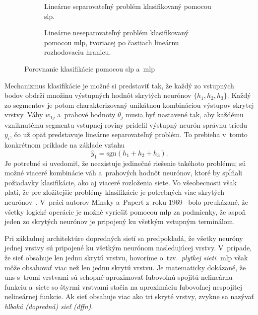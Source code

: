   \begin{figure}[t!]
    \centering
    \begin{subfigure}[t]{0.48\textwidth}\centering
      
      \caption{Lineárne separovateľný problém klasifikovaný pomocou \acrshort{slp}.}
    \end{subfigure}
    \hfill
    \begin{subfigure}[t]{0.48\textwidth}\centering
      
      \caption{Lineárne neseparovateľný problém klasifikovaný pomocou \acrshort{mlp}, tvoriacej po častiach lineárnu rozhodovaciu hranicu.}
    \end{subfigure}
    \caption[Porovnanie klasifikácie pomocou \acrshort{slp} a~\acrshort{mlp}]{Porovnanie klasifikácie pomocou \acrshort{slp} a~\acrshort{mlp}}\label{fig:lin-sep-solution}
  \end{figure}

  Mechanizmus klasifikácie je možné si predstaviť tak, že každý zo vstupných bodov obdrží množinu výstupných hodnôt skrytých neurónov $\{h_1, h_2, h_3\}$. Každý zo segmentov je potom charakterizovaný unikátnou kombináciou výstupov skrytej vrstvy. Váhy $w_{1j}$ a~prahové hodnoty ${\theta_j}$ musia byť nastavené tak, aby každému vzniknutému segmentu vstupnej roviny pridelil výstupný neurón správnu triedu $y_i$, čo už opäť predstavuje lineárne separovateľný problém. To prebieha v~tomto konkrétnom príklade na základe vzťahu
  \begin{equation}
    \hat y_1 = \mathrm{sgn} \left( h_1 + h_2 + h_3 \right).
  \end{equation}
  Je potrebné si uvedomiť, že neexistuje jedinečné riešenie takéhoto problému; sú možné viaceré kombinácie váh a~prahových hodnôt neurónov, ktoré by spĺňali požiadavky klasifikácie, ako aj viaceré rozloženia siete. Vo všeobecnosti však platí, že pre zložitejšie problémy klasifikácie je potrebných viac skrytých neurónov~\cite{mehligMachineLearningNeural2021}. V~práci autorov Minsky a~Papert z~roku 1969~\cite{minskyPerceptronsIntroductionComputational2017} bolo preukázané, že všetky logické operácie je možné vyriešiť pomocou \acrshort{mlp} za podmienky, že aspoň jeden zo skrytých neurónov je pripojený ku všetkým vstupným terminálom.

  Pri základnej architektúre dopredných sietí sa predpokladá, že všetky neuróny jednej vrstvy sú pripojené ku všetkým neurónom nasledujúcej vrstvy\@. V~prípade, že sieť obsahuje len jednu skrytú vrstvu, hovoríme o~tzv.\ \emph{plytkej sieti}\@. \acrshort{mlp} však môže obsahovať viac než len jednu skrytú vrstvu. Je matematicky dokázané, že \acrshort{uns} s~tromi vrstvami sú schopné aproximovať ľubovoľnú spojitú nelineárnu funkciu a~siete so štyrmi vrstvami stačia na aproximáciu ľubovoľnej nespojitej nelineárnej funkcie. Ak sieť obsahuje viac ako tri skryté vrstvy, zvykne sa nazývať \emph{hlboká (dopredná) sieť (\acrshort{dffn})}.
  
